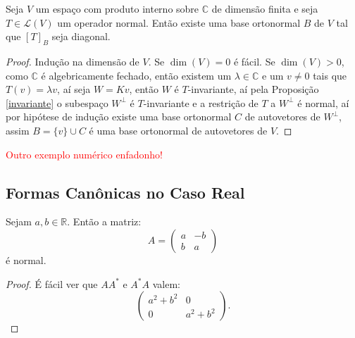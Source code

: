 \documentclass[11pt,twoside,a4paper]{book}
\begin{document}
\begin{teorema}
Seja $V$ um espaço com produto interno sobre $\mathbb{C}$ de dimensão finita e seja $T\in\mathcal{L}(V)$ um operador normal. Então existe uma base ortonormal $B$ de $V$ tal que $[T]_B$ seja diagonal.
\end{teorema}
\begin{proof}
Indução na dimensão de $V.$ Se $\dim(V)=0$ é fácil. Se $\dim(V)>0$, como $\mathbb{C}$ é algebricamente fechado, então existem um $\lambda\in \mathbb{C}$ e um $v\neq 0$ tais que $T(v)=\lambda v$, aí seja $W=Kv$, então $W$ é $T$-invariante, aí pela Proposição \ref{invariante} o subespaço $W^\perp$ é $T$-invariante e a restrição de $T$ a $W^\perp$ é normal, aí por hipótese de indução existe uma base ortonormal $C$ de autovetores de $W^\perp$, assim $B=\{v\}\cup C$ é uma base ortonormal de autovetores de $V.$
\end{proof}

\noindent
\textcolor{red}{Outro exemplo numérico enfadonho!}

\subsection{Formas Canônicas no Caso Real}

\begin{proposicao}
Sejam $a,b\in\mathbb{R}$. Então a matriz:
\[
A=\begin{pmatrix}
a&-b\\b&a
\end{pmatrix}
\]
é normal.
\end{proposicao}
\begin{proof}
É fácil ver que $AA^*$ e $A^*A$ valem:
\[
\begin{pmatrix}
a^2+b^2&0\\0&a^2+b^2
\end{pmatrix}.
\]
\end{proof}
\end{document}
